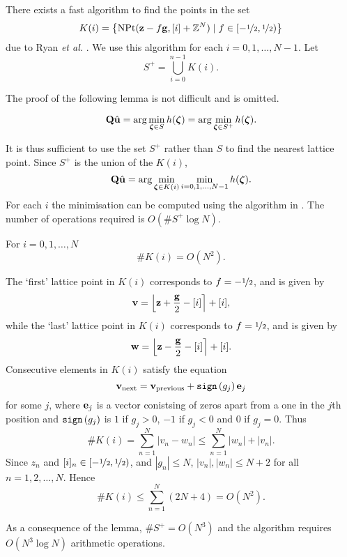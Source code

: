 There exists a fast algorithm to find the points in the set
\[
K(i) = \left\{ \operatorname{NPt}(\mathbf{z} - f\mathbf{g}, [i] + {\mathbb Z}^N) \mid f \in [-\nicefrac{1}{2},\nicefrac{1}{2}) \right\}
\]
due to Ryan \emph{et al.} \cite{Ryan2007, McKilliam2007}.  We use this algorithm for each $i = 0,1,\dots,N-1$. Let
\begin{equation} \label{eq:S+}
S^+ = \bigcup_{i=0}^{n-1} K(i).
\end{equation}

The proof of the following lemma is not difficult and is omitted.

\begin{lemma} \label{lem:minSS+equal}
\[
\mathbf{Q}\hat{\mathbf{u}} = \arg\min_{\boldsymbol{\zeta} \in S} h(\boldsymbol{\zeta}) = \arg\min_{\boldsymbol{\zeta} \in S^+} h(\boldsymbol{\zeta}).
\]
\end{lemma}

It is thus sufficient to use the set $S^+$ rather than $S$ to find the nearest lattice point.  Since $S^+$ is the union of the $K(i)$,
\[
\mathbf{Q}\hat{\mathbf{u}} = \arg\min_{\boldsymbol{\zeta} \in K(i)}\min_{i=0,1,\dots,N-1} h(\boldsymbol{\zeta}).
\]
For each $i$ the minimisation can be computed using the algorithm in \cite{Ryan2007, McKilliam2007}.  The number of operations required is $O(\#S^+\log{N})$.

\begin{lemma} \label{lem:sizeK=O(N^2)}
For $i=0,1,\dots,N$
\[
\#K(i) = O(N^2).
\]
\end{lemma}
\begin{IEEEproof}
The `first' lattice point in $K(i)$ corresponds to $f = -\nicefrac{1}{2}$, and is given by
\[
\mathbf{v} = {\left\lfloor \mathbf{z} + \frac{\mathbf{g}}{2} - [i] \right\rceil} + [i],
\]
while the `last' lattice point in $K(i)$ corresponds to $f = \nicefrac{1}{2}$, and is given by
\[
\mathbf{w} = {\left\lfloor \mathbf{z} - \frac{\mathbf{g}}{2} - [i] \right\rceil} + [i].
\]
Consecutive elements in $K(i)$ satisfy the equation
\[
\mathbf{v}_{\text{next}} = \mathbf{v}_{\text{previous}} + \mathtt{sign}\left( g_j \right)\mathbf{e}_j 
\]
for some $j$, where $\mathbf{e}_j$ is a vector conistsing of zeros apart from a one in the $j$th position and $\mathtt{sign}\left( g_j \right)$ is $1$ if $g_j > 0$, $-1$ if $g_j < 0$ and $0$ if $g_j = 0$.  Thus
\[
\#K(i) = \sum_{n=1}^N |v_n - w_n| \leq \sum_{n=1}^N |w_n| + |v_n|.
\]
Since $z_n$ and $[i]_n \in [-\nicefrac{1}{2}, \nicefrac{1}{2})$, and $|g_n| \leq N$, $|v_n|,|w_n| \leq N+2$ for all $n=1,2,\dots,N$.  Hence
\[
\#K(i) \leq \sum_{n=1}^N{ \left(2N + 4\right) } = O(N^2).
\] 
\end{IEEEproof}

As a consequence of the lemma, $\#S^+ = O(N^3)$ and the algorithm requires $O(N^3\log{N})$ arithmetic operations. 



